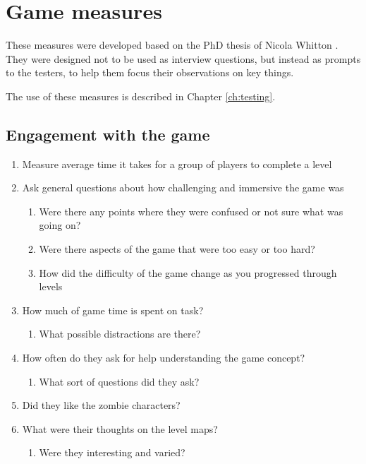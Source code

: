 \chapter{Game measures}
\label{apdx:measures}
These measures were developed based on the PhD thesis of Nicola Whitton \cite{whitton07}.
They were designed not to be used as interview questions, but instead as prompts to
the testers, to help them focus their observations on key things.

The use of these measures is described in Chapter \ref{ch:testing}.

\section{Engagement with the game}

\begin{enumerate}
\item Measure average time it takes for a group of players to complete a level

\item Ask general questions about how challenging and immersive the game was
\begin{enumerate}
    \item Were there any points where they were confused or not sure what was going on?
    \item Were there aspects of the game that were too easy or too hard?
    \item How did the difficulty of the game change as you progressed through levels
\end{enumerate}

\item How much of game time is spent on task?
\begin{enumerate}
    \item What possible distractions are there?
\end{enumerate}

\item How often do they ask for help understanding the game concept?
\begin{enumerate}
    \item What sort of questions did they ask?
\end{enumerate}

\item Did they like the zombie characters?

\item What were their thoughts on the level maps?
\begin{enumerate}
    \item Were they interesting and varied?
\end{enumerate}

\end{enumerate}

